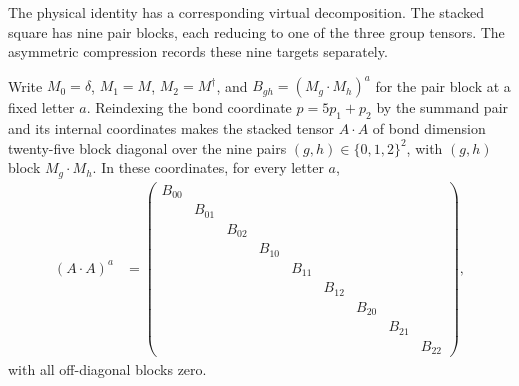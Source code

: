 The physical identity has a corresponding virtual decomposition.
The stacked square has nine pair blocks, each reducing to one of the
three group tensors. The asymmetric compression records these nine
targets separately.

\begin{lemma}
    \label{thm:asymex_z3anomalous_defect_square_blocks}
    \leanok
    Write $M_0=\delta$, $M_1=M$, $M_2=M^\dagger$, and
    $B_{gh}=(M_g\cdot M_h)^a$ for the pair block at a fixed letter $a$.
    Reindexing the bond coordinate $p=5p_1+p_2$ by the summand pair and its
    internal coordinates makes the stacked tensor $A\cdot A$ of bond dimension
    twenty-five block diagonal over the nine pairs
    $(g,h)\in\{0,1,2\}^2$, with $(g,h)$ block $M_g\cdot M_h$.
    In these coordinates, for every letter $a$,
    \begin{align}
        (A\cdot A)^{a} & =
        \begin{pmatrix}
            B_{00}                                                                   \\
             & B_{01}                                                                \\
             &        & B_{02}                                                       \\
             &        &        & B_{10}                                              \\
             &        &        &        & B_{11}                                     \\
             &        &        &        &        & B_{12}                            \\
             &        &        &        &        &        & B_{20}                   \\
             &        &        &        &        &        &        & B_{21}          \\
             &        &        &        &        &        &        &        & B_{22}
        \end{pmatrix},
        \label{eq:asymex_z3anomalous_defect_square_blocks}
    \end{align}
    with all off-diagonal blocks zero.
\end{lemma}

